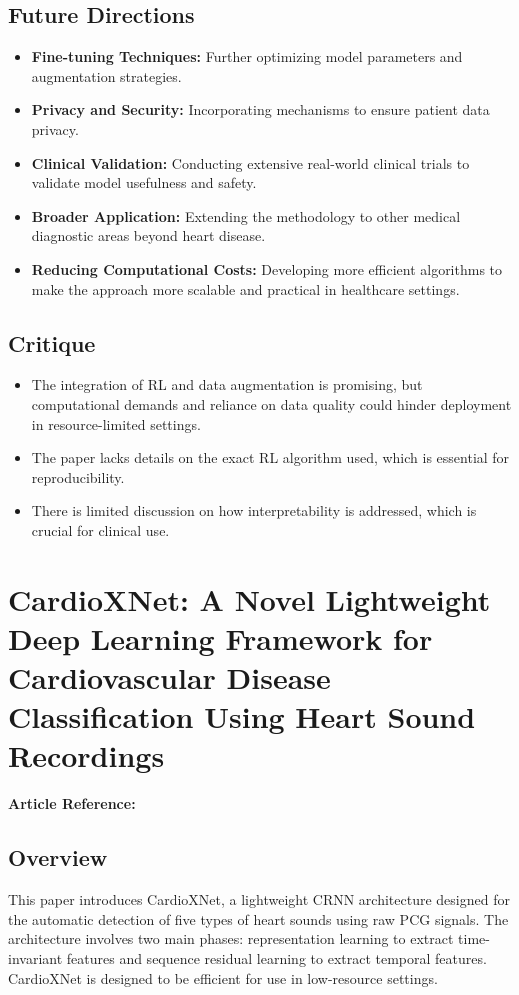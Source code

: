 \subsection*{Future Directions}
\begin{itemize}
    \item \textbf{Fine-tuning Techniques:} Further optimizing model parameters and augmentation strategies.
    \item \textbf{Privacy and Security:} Incorporating mechanisms to ensure patient data privacy.
    \item \textbf{Clinical Validation:} Conducting extensive real-world clinical trials to validate model usefulness and safety.
    \item \textbf{Broader Application:} Extending the methodology to other medical diagnostic areas beyond heart disease.
    \item \textbf{Reducing Computational Costs:} Developing more efficient algorithms to make the approach more scalable and practical in healthcare settings.
\end{itemize}

\subsection*{Critique}
\begin{itemize}
    \item The integration of RL and data augmentation is promising, but computational demands and reliance on data quality could hinder deployment in resource-limited settings.
    \item The paper lacks details on the exact RL algorithm used, which is essential for reproducibility.
    \item There is limited discussion on how interpretability is addressed, which is crucial for clinical use.
\end{itemize}

\section{CardioXNet: A Novel Lightweight Deep Learning Framework for Cardiovascular Disease Classification Using Heart Sound Recordings}
\textbf{Article Reference:} \cite{article_6}

\subsection*{Overview}
This paper introduces CardioXNet, a lightweight CRNN architecture designed for the automatic detection of five types of heart sounds using raw PCG signals. The architecture involves two main phases: representation learning to extract time-invariant features and sequence residual learning to extract temporal features. CardioXNet is designed to be efficient for use in low-resource settings.

